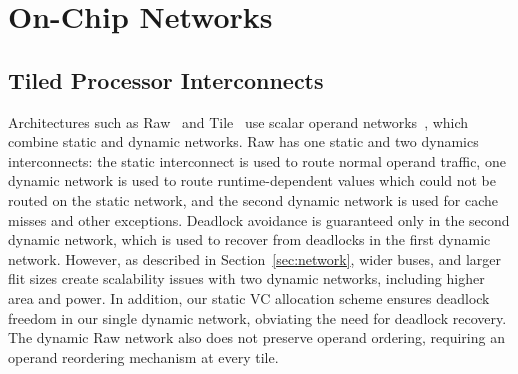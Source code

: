 

\section{On-Chip Networks}

\subsection{Tiled Processor Interconnects} Architectures such as Raw~\cite{raw} and Tile~\cite{tile} use scalar operand networks~\cite{son}, which combine static and dynamic networks. Raw has one static and two dynamics interconnects: the static interconnect is used to route normal operand traffic, one dynamic network is used to route runtime-dependent values which could not be routed on the static network, and the second dynamic network is used for cache misses and other exceptions. Deadlock avoidance is guaranteed only in the second dynamic network, which is used to recover from deadlocks in the first dynamic network. However, as described in Section~\ref{sec:network}, wider buses, and larger flit sizes create scalability issues with two dynamic networks, including higher area and power. In addition, our static VC allocation scheme ensures deadlock freedom in our single dynamic network, obviating the need for deadlock recovery.
The dynamic Raw network also does not preserve operand ordering, requiring an operand reordering mechanism at every tile.

